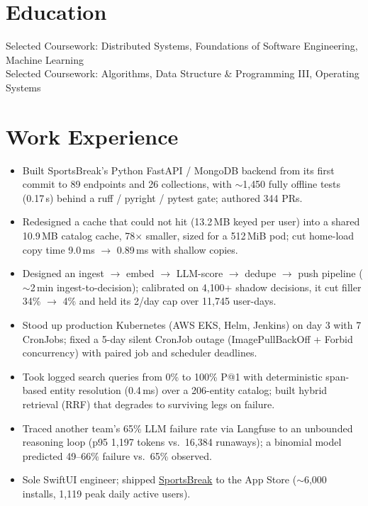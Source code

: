 \documentclass[11pt, letterpaper]{article}
\begin{document}

\section{Education}
Selected Coursework: Distributed Systems, Foundations of Software Engineering, Machine Learning\\[1pt]
Selected Coursework: Algorithms, Data Structure \& Programming III, Operating Systems

\section{Work Experience}
\begin{itemize}
  \item Built SportsBreak's Python FastAPI / MongoDB backend from its first commit to 89 endpoints and 26 collections, with $\sim$1{,}450 fully offline tests (0.17\,s) behind a ruff / pyright / pytest gate; authored 344 PRs.
  \item Redesigned a cache that could not hit (13.2\,MB keyed per user) into a shared 10.9\,MB catalog cache, 78$\times$ smaller, sized for a 512\,MiB pod; cut home-load copy time 9.0\,ms $\to$ 0.89\,ms with shallow copies.
  \item Designed an ingest $\to$ embed $\to$ LLM-score $\to$ dedupe $\to$ push pipeline ($\sim$2\,min ingest-to-decision); calibrated on 4{,}100+ shadow decisions, it cut filler 34\% $\to$ 4\% and held its 2/day cap over 11{,}745 user-days.
  \item Stood up production Kubernetes (AWS EKS, Helm, Jenkins) on day 3 with 7 CronJobs; fixed a 5-day silent CronJob outage (ImagePullBackOff + Forbid concurrency) with paired job and scheduler deadlines.
  \item Took logged search queries from 0\% to 100\% P@1 with deterministic span-based entity resolution (0.4\,ms) over a 206-entity catalog; built hybrid retrieval (RRF) that degrades to surviving legs on failure.
  \item Traced another team's 65\% LLM failure rate via Langfuse to an unbounded reasoning loop (p95 1{,}197 tokens vs.\ 16{,}384 runaways); a binomial model predicted 49--66\% failure vs.\ 65\% observed.
  \item Sole SwiftUI engineer; shipped \href{https://apps.apple.com/app/id6762649287}{SportsBreak} to the App Store ($\sim$6{,}000 installs, 1{,}119 peak daily active users).
\end{itemize}
\end{document}
